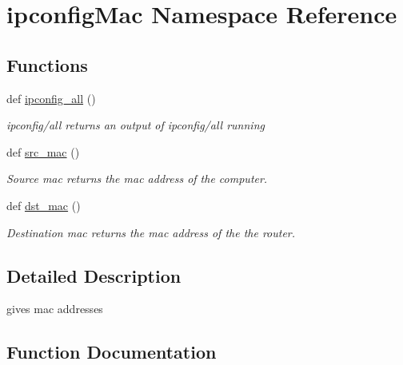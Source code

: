\hypertarget{namespaceipconfig_mac}{}\section{ipconfig\+Mac Namespace Reference}
\label{namespaceipconfig_mac}
\subsection*{Functions}
\begin{DoxyCompactItemize}
\item 
def \hyperlink{namespaceipconfig_mac_a349e0c4208e32fe64e1d3b4f2633bb12}{ipconfig\+\_\+all} ()
\begin{DoxyCompactList}\small\item\em ipconfig/all returns an output of ipconfig/all running \end{DoxyCompactList}\item 
def \hyperlink{namespaceipconfig_mac_a56db04e8b9762a479f6e83b3b1332deb}{src\+\_\+mac} ()
\begin{DoxyCompactList}\small\item\em Source mac returns the mac address of the computer. \end{DoxyCompactList}\item 
def \hyperlink{namespaceipconfig_mac_ad2a16d3ba5c73c898e385b378f4f8a90}{dst\+\_\+mac} ()
\begin{DoxyCompactList}\small\item\em Destination mac returns the mac address of the the router. \end{DoxyCompactList}\end{DoxyCompactItemize}


\subsection{Detailed Description}
\begin{DoxyVerb}gives mac addresses \end{DoxyVerb}
 

\subsection{Function Documentation}
\mbox{\label{namespaceipconfig_mac_ad2a16d3ba5c73c898e385b378f4f8a90}} 
